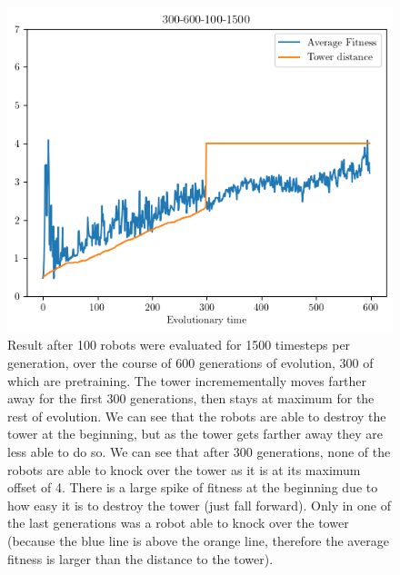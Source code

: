 \documentclass[12pt, a4paper]{article}
\begin{document}


\begin{figure}[h]
\centering
\includegraphics[width=1\textwidth]{300-600-100-1500/300-600-100-1500.png}
\caption{Result after 100 robots were evaluated for 1500 timesteps per generation, over the course of 600 generations of evolution, 300 of which are pretraining. The tower incremementally moves farther away for the first 300 generations, then stays at maximum for the rest of evolution. We can see that the robots are able to destroy the tower at the beginning, but as the tower gets farther away they are less able to do so. We can see that after 300 generations, none of the robots are able to knock over the tower as it is at its maximum offset of 4. There is a large spike of fitness at the beginning due to how easy it is to destroy the tower (just fall forward). Only in one of the last generations was a robot able to knock over the tower (because the blue line is above the orange line, therefore the average fitness is larger than the distance to the tower).}

\end{figure}
\end{document}
